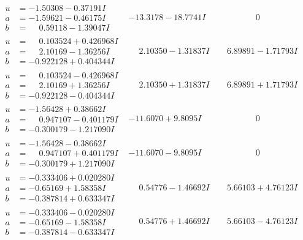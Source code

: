\documentclass[1p]{elsarticle_modified}
\theoremstyle{definition}
\begin{document}
$$\begin{array}{c|c|c}
\begin{aligned}
u &= -1.50308 - 0.37191 I \\
a &= -1.59621 - 0.46175 I \\
b &= \phantom{-}0.59118 - 1.39047 I\end{aligned}
 & -13.3178 - 18.7741 I & \phantom{-0.000000 } 0 \\ \hline\begin{aligned}
u &= \phantom{-}0.103524 + 0.426968 I \\
a &= \phantom{-}2.10169 - 1.36256 I \\
b &= -0.922128 + 0.404344 I\end{aligned}
 & \phantom{-}2.10350 - 1.31837 I & \phantom{-}6.89891 - 1.71793 I \\ \hline\begin{aligned}
u &= \phantom{-}0.103524 - 0.426968 I \\
a &= \phantom{-}2.10169 + 1.36256 I \\
b &= -0.922128 - 0.404344 I\end{aligned}
 & \phantom{-}2.10350 + 1.31837 I & \phantom{-}6.89891 + 1.71793 I \\ \hline\begin{aligned}
u &= -1.56428 + 0.38662 I \\
a &= \phantom{-}0.947107 - 0.401179 I \\
b &= -0.300179 - 1.217090 I\end{aligned}
 & -11.6070 + 9.8095 I & \phantom{-0.000000 } 0 \\ \hline\begin{aligned}
u &= -1.56428 - 0.38662 I \\
a &= \phantom{-}0.947107 + 0.401179 I \\
b &= -0.300179 + 1.217090 I\end{aligned}
 & -11.6070 - 9.8095 I & \phantom{-0.000000 } 0 \\ \hline\begin{aligned}
u &= -0.333406 + 0.020280 I \\
a &= -0.65169 + 1.58358 I \\
b &= -0.387814 + 0.633347 I\end{aligned}
 & \phantom{-}0.54776 - 1.46692 I & \phantom{-}5.66103 + 4.76123 I \\ \hline\begin{aligned}
u &= -0.333406 - 0.020280 I \\
a &= -0.65169 - 1.58358 I \\
b &= -0.387814 - 0.633347 I\end{aligned}
 & \phantom{-}0.54776 + 1.46692 I & \phantom{-}5.66103 - 4.76123 I \\ \hline\begin{aligned}

\end{aligned}
\end{array}$$
\end{document}
